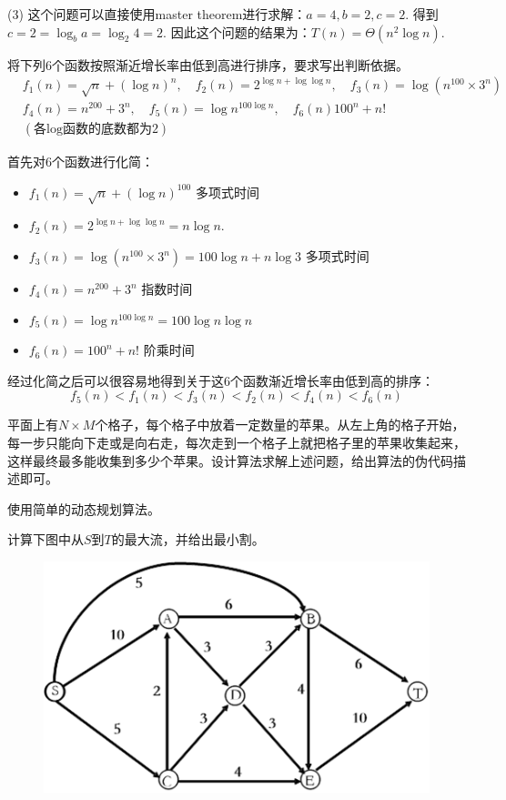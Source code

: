 \documentclass{myhw}
\begin{document}
\begin{solution}
(3) 这个问题可以直接使用master theorem进行求解：$a=4,b=2,c=2$.
得到$c=2=\log_b a=\log_2 4=2$.
因此这个问题的结果为：$T(n)=\Theta(n^2\log n)$.
\end{solution}
\begin{homeworkProblem}
将下列6个函数按照渐近增长率由低到高进行排序，要求写出判断依据。
\[
\begin{split}
&f_1(n)=\sqrt{n}+(\log n)^n,\quad f_2(n)=2^{\log n +\log \log n},\quad f_3(n)=\log\left(n^{100}\times 3^n\right)\\
& f_4(n)=n^{200}+3^{n},\quad f_5(n)=\log n^{100\log n},\quad f_6(n)100^n+n!\\
&(\text{各log函数的底数都为}2)
\end{split}
\]
\end{homeworkProblem}
\begin{solution}
首先对6个函数进行化简：
\begin{itemize}
\item $f_1(n)=\sqrt{n}+(\log n)^{100}$ 多项式时间
\item $f_2(n)=2^{\log n+\log \log n}=n\log n$.
\item $f_3(n)=\log (n^{100}\times 3^n)=100\log n+n\log 3$ 多项式时间
\item $f_4(n)=n^{200}+3^n$ 指数时间
\item $f_5(n)=\log n ^{100\log n}=100 \log n \log n$
\item $f_6(n)=100^n+n!$ 阶乘时间
\end{itemize}
经过化简之后可以很容易地得到关于这6个函数渐近增长率由低到高的排序：
\[
f_5(n)<f_1(n)<f_3(n)<f_2(n)<f_4(n)<f_6(n)
\]
\end{solution}
\begin{homeworkProblem}
平面上有$N\times M$个格子，每个格子中放着一定数量的苹果。从左上角的格子开始，每一步只能向下走或是向右走，每次走到一个格子上就把格子里的苹果收集起来，这样最终最多能收集到多少个苹果。设计算法求解上述问题，给出算法的伪代码描述即可。
\end{homeworkProblem}
\begin{solution}
使用简单的动态规划算法。
\end{solution}
\begin{homeworkProblem}
计算下图中从$S$到$T$的最大流，并给出最小割。
\begin{figure}[!htbp]
\centering
\includegraphics{fig5.png}
\end{figure}
\end{homeworkProblem}
\end{document}
